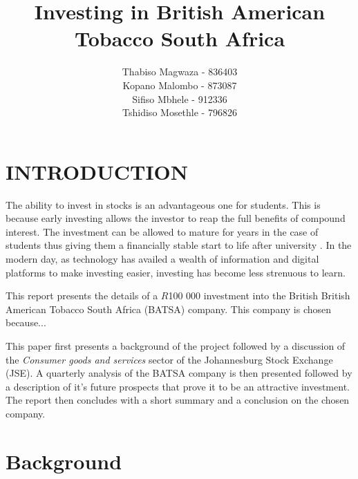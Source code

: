 \documentclass[letterpaper, 10 pt, conference]{ieeeconf}  %
\title{\LARGE \bf
Investing in British American Tobacco South Africa 
}
\author{Thabiso Magwaza - 836403 \\ Kopano Malombo - 873087\\ Sifiso Mbhele - 912336 \\ Tshidiso Mosethle - 796826 }
\begin{document}
\maketitle
\thispagestyle{empty}
\pagestyle{empty}


\begin{abstract}

\end{abstract}


\section{INTRODUCTION}

The ability to invest in stocks is an advantageous one for students. This is because early investing allows the investor to reap the full benefits of compound interest. The investment can be allowed to mature for years in the case of students thus giving them a financially stable start to life after university \cite{earlyInvestment}. In the modern day, as technology has availed a wealth of information and digital platforms to make investing easier, investing has become less strenuous to learn. 

This report presents the details of a $R$100 000 investment into the British British American Tobacco South Africa (BATSA) company. This company is chosen because...

This paper first presents a background of the project followed by a discussion of the \textit{Consumer goods and services} sector of the Johannesburg Stock Exchange (JSE). A quarterly analysis of the BATSA company is then presented followed by a description of it's future prospects that prove it to be an attractive investment. The report then concludes with a short summary and a conclusion on the chosen company. 

\section{Background}
\end{document}
